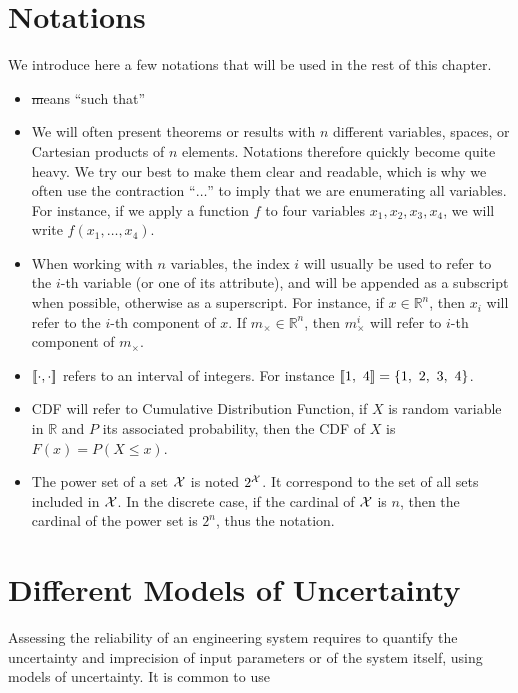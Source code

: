 \section{Notations}
We introduce here a few notations that will be used in the rest of this chapter. 
\begin{itemize}
    \item \st means ``such that''
    \item We will often present theorems or results with $n$ different variables, spaces, or Cartesian products of $n$ elements. Notations therefore quickly become quite heavy. We try our best to make them clear and readable, which is why we often use the contraction ``$\dots$'' to imply that we are enumerating all variables. For instance, if we apply a function $f$ to four variables $x_1, x_2, x_3, x_4$, we will write $f(x_1, \dots, x_4)$.
    \item When working with $n$ variables, the index $i$ will usually be used to refer to the $i$-th variable (or one of its attribute), and will be appended as a subscript when possible, otherwise as a superscript. For instance, if $x\in\mathbb{R}^n$, then $x_i$ will refer to the $i$-th component of $x$. If $m_\times\in\mathbb{R}^n$, then $m_\times^i$ will refer to $i$-th component of $m_\times$.
    \item ${[\![}\cdot,\cdot{]\!]}$ refers to an interval of integers. For instance ${[\![}1,~4{]\!]}=\{1,~2,~3,~4\}$. 
    \item CDF will refer to Cumulative Distribution Function, \ie if $X$ is random variable in $\mathbb{R}$ and $P$ its associated probability, then the CDF of $X$ is $F(x)=P(X\leqslant x)$.
    \item The power set of a set ${\mathcal{X}}$ is noted $2^{\mathcal{X}}$. It correspond to the set of all sets included in ${\mathcal{X}}$. In the discrete case, if the cardinal of ${\mathcal{X}}$ is $n$, then the cardinal of the power set is $2^n$, thus the notation.
\end{itemize}

\section{Different Models of Uncertainty}
Assessing the reliability of an engineering system requires to quantify the uncertainty and imprecision of input parameters or of the system itself, using models of uncertainty. It is common to use 
